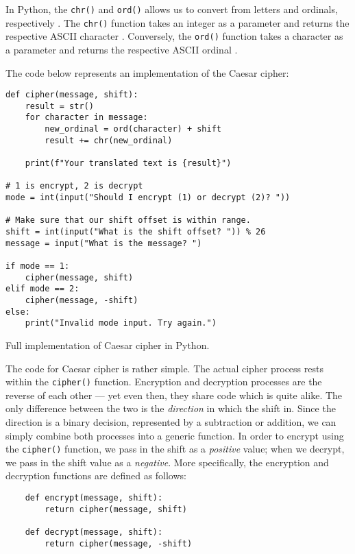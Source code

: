 In Python, the \texttt{chr()} and \texttt{ord()} allows us to convert from letters and ordinals, respectively \cite{caesar_cipher_invent_with_python}. 
The \texttt{chr()} function takes an integer as a parameter and returns the respective ASCII character \cite{caesar_cipher_invent_with_python}. Conversely, 
the \texttt{ord()} function takes a character as a parameter and returns the respective ASCII ordinal \cite{caesar_cipher_invent_with_python}. 

The code below represents an implementation of the Caesar cipher:

\begin{listing}[H]
    \begin{verbatim}
def cipher(message, shift):
    result = str()
    for character in message:
        new_ordinal = ord(character) + shift
        result += chr(new_ordinal)
        
    print(f"Your translated text is {result}")
    
# 1 is encrypt, 2 is decrypt
mode = int(input("Should I encrypt (1) or decrypt (2)? "))
    
# Make sure that our shift offset is within range.
shift = int(input("What is the shift offset? ")) % 26
message = input("What is the message? ")
    
if mode == 1:
    cipher(message, shift)
elif mode == 2:
    cipher(message, -shift)
else:
    print("Invalid mode input. Try again.")    
    \end{verbatim}
    \caption{Full implementation of Caesar cipher in Python.}
\end{listing}

The code for Caesar cipher is rather simple. The actual cipher process rests within the \texttt{cipher()} function.
Encryption and decryption processes are the reverse of each other --- yet even then, they share code which is quite alike.
The only difference between the two is the \textit{direction} in which the shift in. Since the direction is a binary decision, 
represented by a subtraction or addition, we can simply combine both processes into a generic function. In order to encrypt
using the \texttt{cipher()} function, we pass in the shift as a \textit{positive} value; when we decrypt, we pass in the shift
value as a \textit{negative}. More specifically, the encryption and decryption functions are defined as follows:

\begin{listing}[H]
    \begin{verbatim}
    def encrypt(message, shift):
        return cipher(message, shift)
    
    def decrypt(message, shift):
        return cipher(message, -shift)
    \end{verbatim}
\end{listing}

